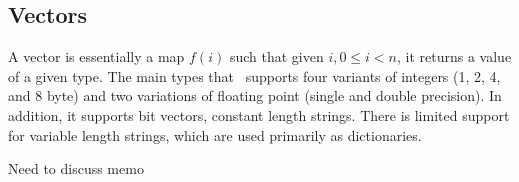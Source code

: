 \subsection{Vectors}
\label{vectors}

A vector is essentially a map \(f(i)\) such that given \(i, 0 \leq i < n\), it
returns a value of a given type. The main types that \Q\ supports four variants
of integers (1, 2, 4, and 8 byte) and two variations of floating point (single
and double precision). In addition, it supports bit vectors, constant length
strings. There is limited support for variable length strings, which are used
primarily as dictionaries.

Need to discuss memo \TBC
